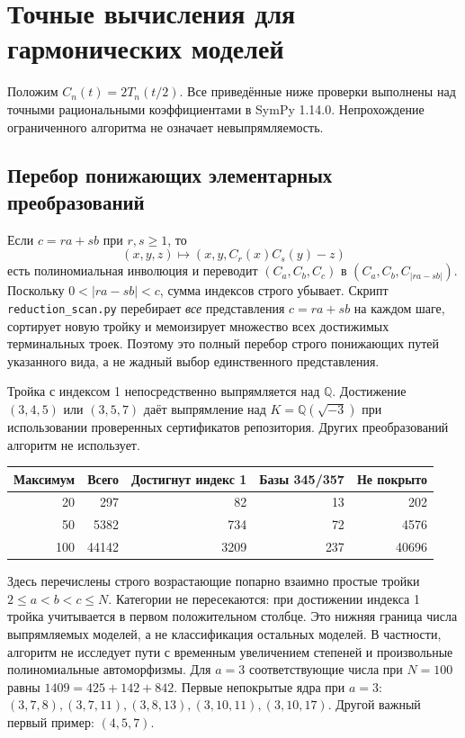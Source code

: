 \section{Точные вычисления для гармонических моделей}
Положим $C_n(t)=2T_n(t/2)$. Все приведённые ниже проверки выполнены
над точными рациональными коэффициентами в SymPy 1.14.0. Непрохождение
ограниченного алгоритма не означает невыпрямляемость.

\subsection{Перебор понижающих элементарных преобразований}
Если $c=ra+sb$ при $r,s\geq1$, то
\[
 (x,y,z)\longmapsto(x,y,C_r(x)C_s(y)-z)
\]
есть полиномиальная инволюция и переводит $(C_a,C_b,C_c)$ в
$(C_a,C_b,C_{|ra-sb|})$. Поскольку $0<|ra-sb|<c$, сумма индексов
строго убывает. Скрипт \texttt{reduction\_scan.py} перебирает \emph{все}
представления $c=ra+sb$ на каждом шаге, сортирует новую тройку и
мемоизирует множество всех достижимых терминальных троек. Поэтому
это полный перебор строго понижающих путей указанного вида, а не
жадный выбор единственного представления.

Тройка с индексом 1 непосредственно выпрямляется над $\mathbb Q$.
Достижение $(3,4,5)$ или $(3,5,7)$ даёт выпрямление над
$K=\mathbb Q(\sqrt{-3})$ при использовании проверенных сертификатов
репозитория. Других преобразований алгоритм не использует.
\begin{center}
\begin{tabular}{r|r|r|r|r}
Максимум & Всего & Достигнут индекс 1 & Базы 345/357 & Не покрыто \\
\hline
20 & 297 & 82 & 13 & 202\\
50 & 5382 & 734 & 72 & 4576\\
100 & 44142 & 3209 & 237 & 40696
\end{tabular}
\end{center}
Здесь перечислены строго возрастающие попарно взаимно простые тройки
$2\leq a<b<c\leq N$. Категории не пересекаются: при достижении
индекса 1 тройка учитывается в первом положительном столбце.
Это нижняя граница числа выпрямляемых моделей, а не классификация
остальных моделей. В частности, алгоритм не исследует пути с временным
увеличением степеней и произвольные полиномиальные автоморфизмы.
Для $a=3$ соответствующие числа при $N=100$ равны
$1409=425+142+842$. Первые непокрытые ядра при $a=3$:
$(3,7,8),(3,7,11),(3,8,13),(3,10,11),(3,10,17)$.
Другой важный первый пример: $(4,5,7)$.

